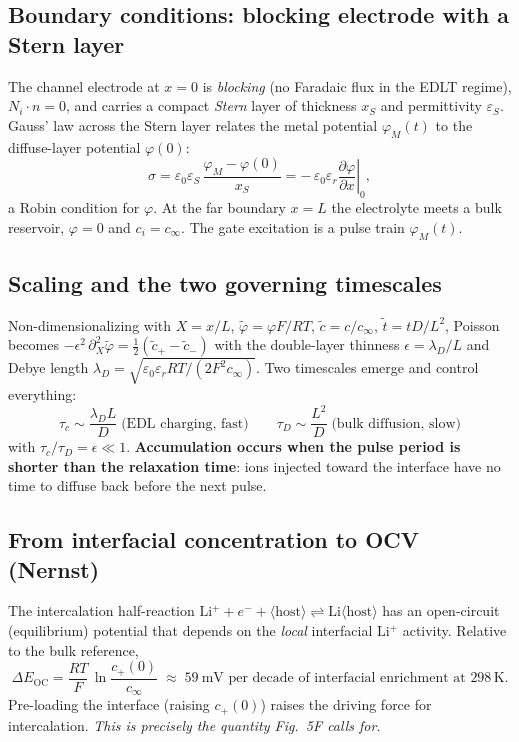 \documentclass[11pt,a4paper]{article}
\newcommand{\Lip}{\ensuremath{\mathrm{Li^{+}}}}
\newcommand{\cinf}{\ensuremath{c_{\infty}}}
\newcommand{\cs}{\ensuremath{c_{+}(0)}}
\begin{document}
\subsection{Boundary conditions: blocking electrode with a Stern layer}
The channel electrode at $x=0$ is \emph{blocking} (no Faradaic flux in the EDLT
regime), $N_i\!\cdot\!n=0$, and carries a compact \emph{Stern} layer of
thickness $x_S$ and permittivity $\varepsilon_S$. Gauss' law across the Stern
layer relates the metal potential $\varphi_M(t)$ to the diffuse-layer potential
$\varphi(0)$:
\begin{equation}
\sigma = \varepsilon_0\varepsilon_S\,\frac{\varphi_M-\varphi(0)}{x_S}
       = -\,\varepsilon_0\varepsilon_r\left.\frac{\partial\varphi}{\partial x}\right|_{0},
\label{eq:stern}
\end{equation}
a Robin condition for $\varphi$. At the far boundary $x=L$ the electrolyte meets
a bulk reservoir, $\varphi=0$ and $c_i=\cinf$. The gate excitation is a pulse
train $\varphi_M(t)$.

\subsection{Scaling and the two governing timescales}
Non-dimensionalizing with $X=x/L$, $\tilde\varphi=\varphi F/RT$,
$\tilde c=c/\cinf$, $\tilde t=tD/L^2$, Poisson becomes
$-\epsilon^2\,\partial_X^2\tilde\varphi=\tfrac12(\tilde c_+-\tilde c_-)$ with the
double-layer thinness $\epsilon=\lambda_D/L$ and Debye length
$\lambda_D=\sqrt{\varepsilon_0\varepsilon_r RT/(2F^2\cinf)}$. Two timescales
emerge and control everything:
\begin{equation}
\boxed{\;\tau_c \sim \frac{\lambda_D L}{D}\;\text{(EDL charging, fast)}\qquad
        \tau_D \sim \frac{L^2}{D}\;\text{(bulk diffusion, slow)}\;}
\label{eq:tau}
\end{equation}
with $\tau_c/\tau_D=\epsilon\ll1$. \textbf{Accumulation occurs when the pulse
period is shorter than the relaxation time}: ions injected toward the interface
have no time to diffuse back before the next pulse.

\subsection{From interfacial concentration to OCV (Nernst)}
The intercalation half-reaction
$\Lip + e^- + \langle\text{host}\rangle \rightleftharpoons \mathrm{Li}\langle\text{host}\rangle$
has an open-circuit (equilibrium) potential that depends on the \emph{local}
interfacial \Lip{} activity. Relative to the bulk reference,
\begin{equation}
\Delta E_{\mathrm{OC}} = \frac{RT}{F}\,\ln\!\frac{\cs}{\cinf}
 \;\approx\; 59\ \text{mV per decade of interfacial enrichment at }298\,\text{K}.
\label{eq:nernst}
\end{equation}
Pre-loading the interface (raising $\cs$) raises the driving force for
intercalation. \emph{This is precisely the quantity Fig.~5F calls for.}
\end{document}

